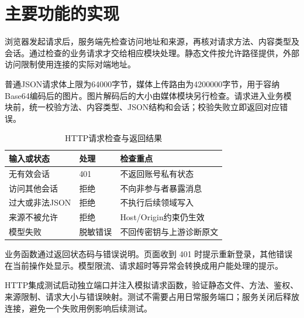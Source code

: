 \section{主要功能的实现}
浏览器发起请求后，服务端先检查访问地址和来源，再核对请求方法、内容类型及会话。通过检查的业务请求才交给相应模块处理。静态文件按允许路径提供，外部访问限制使用连接的实际对端地址。

普通JSON请求体上限为64000字节，媒体上传路由为4200000字节，用于容纳Base64编码后的图片。图片解码后的大小由媒体模块另行检查。请求进入业务模块前，统一校验方法、内容类型、JSON结构和会话；校验失败立即返回对应错误。

\begin{table}[H]\centering\small
\caption{HTTP请求检查与返回结果}
\begin{tabularx}{\linewidth}{@{}p{30mm}p{22mm}X@{}}\toprule
输入或状态 & 处理 & 检查重点 \\ \midrule
无有效会话 & 401 & 不返回账号私有状态 \\
访问其他会话 & 拒绝 & 不向非参与者暴露消息 \\
过大或非法JSON & 拒绝 & 不执行后续领域写入 \\
来源不被允许 & 拒绝 & Host/Origin约束仍生效 \\
模型失败 & 脱敏错误 & 不回传密钥与上游诊断原文 \\ \bottomrule
\end{tabularx}\end{table}

业务函数通过返回状态码与错误说明。页面收到 401 时提示重新登录，其他错误在当前操作处显示。模型限流、请求超时等异常会转换成用户能处理的提示。

HTTP集成测试启动独立端口并注入模拟请求函数，验证静态文件、方法、鉴权、来源限制、请求大小与错误映射。测试不需要占用日常服务端口；服务关闭后释放连接，避免一个失败用例影响后续测试。
